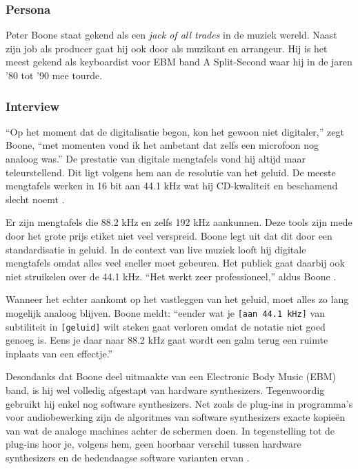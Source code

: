 \subsubsection*{Persona}

Peter Boone staat gekend als een \textit{jack of all trades} in de muziek wereld. Naast zijn job als producer gaat hij ook door als muzikant en arrangeur. Hij is het meest gekend als keyboardist voor EBM band A Split-Second waar hij in de jaren '80 tot '90 mee tourde.

\subsubsection*{Interview}

``Op het moment dat de digitalisatie begon, kon het gewoon niet digitaler,'' zegt Boone, ``met momenten vond ik het ambetant dat zelfs een microfoon nog analoog was.'' \autocite{peterboone} De prestatie van digitale mengtafels vond hij altijd maar teleurstellend. Dit ligt volgens hem aan de resolutie van het geluid. De meeste mengtafels werken in 16 bit aan 44.1 kHz wat hij CD-kwaliteit en beschamend slecht noemt \autocite{peterboone}.

Er zijn mengtafels die 88.2 kHz en zelfs 192 kHz aankunnen. Deze tools zijn mede door het grote prijs etiket niet veel verspreid. Boone legt uit dat dit door een standardisatie in geluid. In de context van live muziek looft hij digitale mengtafels omdat alles veel sneller moet gebeuren. Het publiek gaat daarbij ook niet struikelen over de 44.1 kHz. ``Het werkt zeer professioneel,'' aldus Boone \autocite{peterboone}.

Wanneer het echter aankomt op het vastleggen van het geluid, moet alles zo lang mogelijk analoog blijven. Boone meldt: ``eender wat je \verb+[aan 44.1 kHz]+ van subtiliteit in \verb+[geluid]+ wilt steken gaat verloren omdat de notatie niet goed genoeg is. Eens je daar naar 88.2 kHz gaat wordt een galm terug een ruimte inplaats van een effectje.'' \autocite{peterboone}

Desondanks dat Boone deel uitmaakte van een Electronic Body Music (EBM) band, is hij wel volledig afgestapt van hardware synthesizers. Tegenwoordig gebruikt hij enkel nog software synthesizers. Net zoals de plug-ins in programma's voor audiobewerking zijn de algoritmes van software synthesizers exacte kopieën van wat de analoge machines achter de schermen doen. In tegenstelling tot de plug-ins hoor je, volgens hem, geen hoorbaar verschil tussen hardware synthesizers en de hedendaagse software varianten ervan \autocite{peterboone}.

